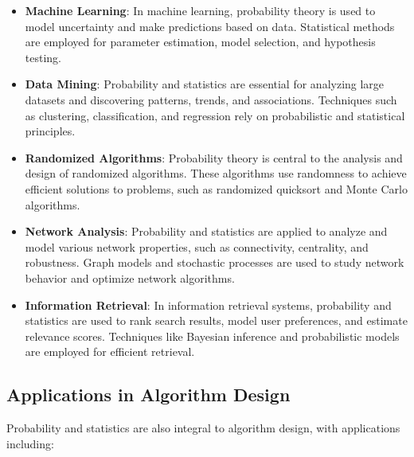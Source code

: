 \documentclass[12pt]{book} %
\begin{document}
\begin{itemize}
    \item \textbf{Machine Learning}: In machine learning, probability theory is used to model uncertainty and make predictions based on data. Statistical methods are employed for parameter estimation, model selection, and hypothesis testing.
    
    \item \textbf{Data Mining}: Probability and statistics are essential for analyzing large datasets and discovering patterns, trends, and associations. Techniques such as clustering, classification, and regression rely on probabilistic and statistical principles.
    
    \item \textbf{Randomized Algorithms}: Probability theory is central to the analysis and design of randomized algorithms. These algorithms use randomness to achieve efficient solutions to problems, such as randomized quicksort and Monte Carlo algorithms.
    
    \item \textbf{Network Analysis}: Probability and statistics are applied to analyze and model various network properties, such as connectivity, centrality, and robustness. Graph models and stochastic processes are used to study network behavior and optimize network algorithms.
    
    \item \textbf{Information Retrieval}: In information retrieval systems, probability and statistics are used to rank search results, model user preferences, and estimate relevance scores. Techniques like Bayesian inference and probabilistic models are employed for efficient retrieval.
\end{itemize}

\subsection{Applications in Algorithm Design}
Probability and statistics are also integral to algorithm design, with applications including:
\end{document}
